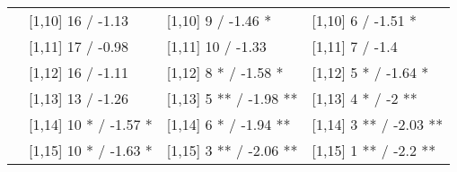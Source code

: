 \begin{table}
\begin{tabular}[t]{llll}
 & {}[1,10] 16  / -1.13 & {}[1,10] 9  / -1.46 * & {}[1,10] 6  / -1.51 *\\
 & {}[1,11] 17  / -0.98 & {}[1,11] 10  / -1.33 & {}[1,11] 7  / -1.4\\
 & {}[1,12] 16  / -1.11 & {}[1,12] 8 * / -1.58 * & {}[1,12] 5 * / -1.64 *\\
\addlinespace
 & {}[1,13] 13  / -1.26 & {}[1,13] 5 ** / -1.98 ** & {}[1,13] 4 * / -2 **\\
 & {}[1,14] 10 * / -1.57 * & {}[1,14] 6 * / -1.94 ** & {}[1,14] 3 ** / -2.03 **\\
 & {}[1,15] 10 * / -1.63 * & {}[1,15] 3 ** / -2.06 ** & {}[1,15] 1 ** / -2.2 **\\
\bottomrule
\end{tabular}
\end{table}
